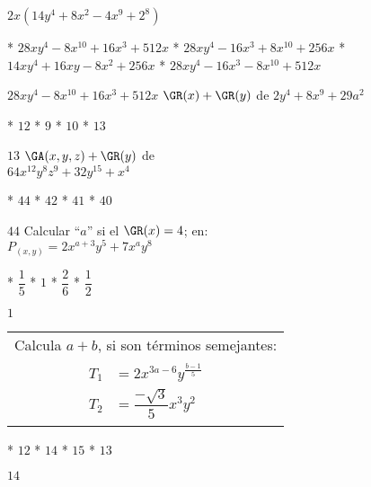 $2x\left(14y^4+8x^2-4x^9+2^8\right)$
\begin{enum}
	* $28xy^4-8x^{10}+16x^3+512x$
	* $28xy^4-16x^3+8x^{10}+256x$
	* $14xy^4+16xy-8x^2+256x$
	* $28xy^4-16x^3-8x^{10}+512x$
\end{enum}
$28xy^4-8x^{10}+16x^3+512x$
$\GR(x)+\GR(y)$ de $2y^4+8x^9+29a^2$
\begin{enum}
	* $12$
	* $9$
	* $10$
	* $13$
\end{enum}
$13$
$\GA(x,y,z)+\GR(y)$ de \\
$64x^{12}y^8z^9+32y^{15}+x^4$
\begin{enum}
	* $44$
	* $42$
	* $41$
	* $40$
\end{enum}
$44$
Calcular ``$a$'' si el $\GR(x)=4$; en: \\
$P_{(x,y)}=2x^{a+3}y^5+7x^ay^8$
\begin{task}
	* $\dfrac{1}{5}$
	* $1$
	* $\dfrac{2}{6}$
	* $\dfrac{1}{2}$
\end{task}
$1$
\begin{tabular}{c}
	Calcula $a+b$, si son t\'erminos semejantes: \\
	$\begin{aligned}
		T_1&=2x^{3a-6}y^{\frac{b-1}{5}} \\
		T_2&=\dfrac{-\sqrt{3}}{5}x^3y^2
	\end{aligned}$
\end{tabular}
\begin{enum}
	* $12$
	* $14$
	* $15$
	* $13$
\end{enum}
$14$
